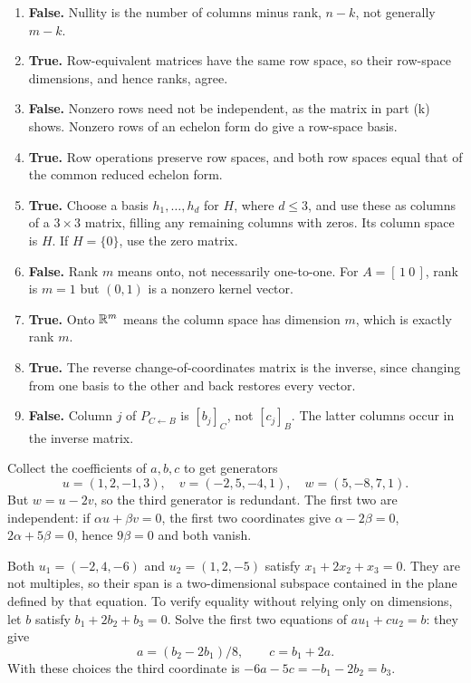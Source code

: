 \begin{enumerate}[label=(\alph*)]
$\left(\begin{smallmatrix}1&0\\2&0\end{smallmatrix}\right)$ has two
nonzero rows but rank one. Count nonzero rows only in an echelon form.
\item \textbf{False.} Nullity is the number of columns minus rank,
$n-k$, not generally $m-k$.
\item \textbf{True.} Row-equivalent matrices have the same row space,
so their row-space dimensions, and hence ranks, agree.
\item \textbf{False.} Nonzero rows need not be independent, as the matrix
in part (k) shows. Nonzero rows of an echelon form do give a row-space basis.
\item \textbf{True.} Row operations preserve row spaces, and both row
spaces equal that of the common reduced echelon form.
\item \textbf{True.} Choose a basis $h_1,\ldots,h_d$ for $H$, where
$d\le3$, and use these as columns of a $3\times3$ matrix, filling any
remaining columns with zeros. Its column space is $H$. If $H=\{0\}$,
use the zero matrix.
\item \textbf{False.} Rank $m$ means onto, not necessarily one-to-one.
For $A=[\,1\ 0\,]$, rank is $m=1$ but $(0,1)$ is a nonzero kernel vector.
\item \textbf{True.} Onto $\mathbb{R}^m$ means the column space has dimension
$m$, which is exactly rank $m$.
\item \textbf{True.} The reverse change-of-coordinates matrix is the
inverse, since changing from one basis to the other and back restores every vector.
\item \textbf{False.} Column $j$ of $P_{C\leftarrow B}$ is $[b_j]_C$,
not $[c_j]_B$. The latter columns occur in the inverse matrix.
\end{enumerate}

Collect the coefficients of $a,b,c$ to get generators
\[
 u=(1,2,-1,3),\quad v=(-2,5,-4,1),\quad w=(5,-8,7,1).
\]
But $w=u-2v$, so the third generator is redundant. The first two are
independent: if $\alpha u+\beta v=0$, the first two coordinates give
$\alpha-2\beta=0$, $2\alpha+5\beta=0$, hence $9\beta=0$ and both vanish.

Both $u_1=(-2,4,-6)$ and $u_2=(1,2,-5)$ satisfy
$x_1+2x_2+x_3=0$. They are not multiples, so their span is a two-dimensional
subspace contained in the plane defined by that equation.
To verify equality without relying only on dimensions, let $b$ satisfy
$b_1+2b_2+b_3=0$. Solve the first two equations of
$au_1+cu_2=b$: they give
\[
 a=(b_2-2b_1)/8,\qquad c=b_1+2a.
\]
With these choices the third coordinate is
$-6a-5c=-b_1-2b_2=b_3$.

